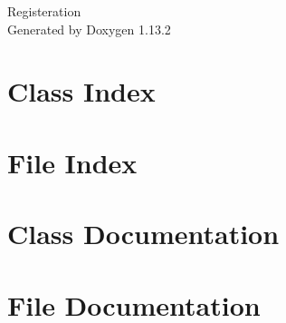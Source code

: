 \documentclass[twoside]{book}
\newcommand{\+}{\discretionary{\mbox{\scriptsize$\hookleftarrow$}}{}{}}
\newcommand{\clearemptydoublepage}{%
    \newpage{\pagestyle{empty}\cleardoublepage}%
  }
\begin{document}
  \raggedbottom
    \hypersetup{pageanchor=false,
                bookmarksnumbered=true,
                pdfencoding=unicode
               }
  \begin{titlepage}
  \vspace*{7cm}
  \begin{center}%
  {\Large Registeration}\\
  \vspace*{1cm}
  {\large Generated by Doxygen 1.13.2}\\
  \end{center}
  \end{titlepage}
  \clearemptydoublepage
  \tableofcontents
  \clearemptydoublepage
  \hypersetup{pageanchor=true}
\chapter{Class Index}

\chapter{File Index}

\chapter{Class Documentation}


\chapter{File Documentation}










  \backmatter
  \newpage
  \clearemptydoublepage
  \printindex
\end{document}

